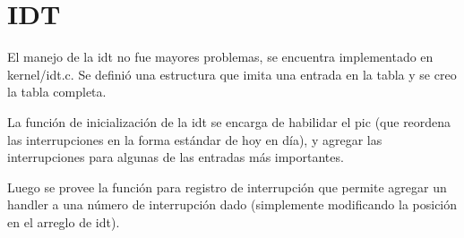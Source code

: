 \section{IDT}

El manejo de la idt no fue mayores problemas, se encuentra implementado en
kernel/idt.c. Se definió una estructura que imita una entrada en la tabla y se
creo la tabla completa.

La función de inicialización de la idt se encarga de habilidar el pic (que
reordena las interrupciones en la forma estándar de hoy en día), y agregar las
interrupciones para algunas de las entradas más importantes.

Luego se provee la función para registro de interrupción que permite agregar un
handler a una número de interrupción dado (simplemente modificando la posición
en el arreglo de idt).

